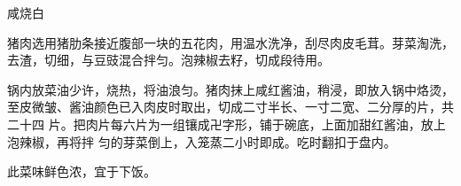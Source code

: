 \begin{recipe}{咸烧白}

\ingredients


\cooking

\step 猪肉选用猪肋条接近腹部一块的五花肉，用温水洗净，刮尽肉皮毛茸。芽菜淘洗，
去渣，切细，与豆豉混合拌匀。泡辣椒去籽，切成段待用。

\step 锅内放菜油少许，烧热，将油浪匀。猪肉抹上咸红酱油，稍浸，即放入锅中烙烫，
至皮微皱、酱油颜色已入肉皮时取出，切成二寸半长、一寸二宽、二分厚的片，共二十四
片。把肉片每六片为一组镶成卍字形，铺于碗底，上面加甜红酱油，放上泡辣椒，再将拌
匀的芽菜倒上，入笼蒸二小时即成。吃时翻扣于盘内。

\notes

此菜味鲜色浓，宜于下饭。

\end{recipe}

